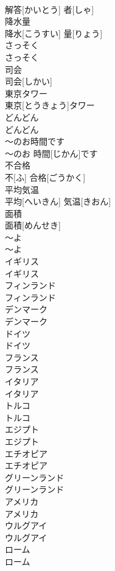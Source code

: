 \documentclass[8pt]{extreport}
\begin{document}
\begin{CJK}{UTF8}{min}
\\	解答[かいとう] 者[しゃ]		
\\	降水量	
\\	降水[こうすい] 量[りょう]		
\\	さっそく	
\\	さっそく		
\\	司会	
\\	司会[しかい]		
\\	東京タワー	
\\	東京[とうきょう]タワー		
\\	どんどん	
\\	どんどん		
\\	〜のお時間です	
\\	〜のお 時間[じかん]です		
\\	不合格	
\\	不[ふ] 合格[ごうかく]		
\\	平均気温	
\\	平均[へいきん] 気温[きおん]		
\\	面積	
\\	面積[めんせき]		
\\	〜よ	
\\	〜よ		
\\	イギリス	
\\	イギリス		
\\	フィンランド	
\\	フィンランド		
\\	デンマーク	
\\	デンマーク		
\\	ドイツ	
\\	ドイツ		
\\	フランス	
\\	フランス		
\\	イタリア	
\\	イタリア		
\\	トルコ	
\\	トルコ		
\\	エジプト	
\\	エジプト		
\\	エチオピア	
\\	エチオピア		
\\	グリーンランド	
\\	グリーンランド		
\\	アメリカ	
\\	アメリカ		
\\	ウルグアイ	
\\	ウルグアイ		
\\	ローム	
\\	ローム		

\end{CJK}
\end{document}
